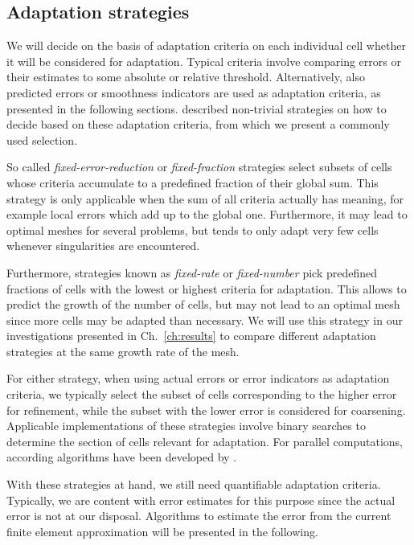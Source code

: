 \subsection{Adaptation strategies}
\label{ssec:strategy}

We will decide on the basis of adaptation criteria on each individual cell whether it will be considered for adaptation. Typical criteria involve comparing errors or their estimates to some absolute or relative threshold. Alternatively, also predicted errors or smoothness indicators are used as adaptation criteria, as presented in the following sections. \textcite[Sec.~5.2]{bangerth2003} described non-trivial strategies on how to decide based on these adaptation criteria, from which we present a commonly used selection.

So called \textit{fixed-error-reduction} or \textit{fixed-fraction} strategies select subsets of cells whose criteria accumulate to a predefined fraction of their global sum. This strategy is only applicable when the sum of all criteria actually has meaning, for example local errors which add up to the global one. Furthermore, it may lead to optimal meshes for several problems, but tends to only adapt very few cells whenever singularities are encountered.

Furthermore, strategies known as \textit{fixed-rate} or \textit{fixed-number} pick predefined fractions of cells with the lowest or highest criteria for adaptation. This allows to predict the growth of the number of cells, but may not lead to an optimal mesh since more cells may be adapted than necessary. We will use this strategy in our investigations presented in Ch.~\ref{ch:results} to compare different adaptation strategies at the same growth rate of the mesh.

For either strategy, when using actual errors or error indicators as adaptation criteria, we typically select the subset of cells corresponding to the higher error for refinement, while the subset with the lower error is considered for coarsening. Applicable implementations of these strategies involve binary searches to determine the section of cells relevant for adaptation. For parallel computations, according algorithms have been developed by \textcites[Sec.~3.1]{burstedde2008}[Sec.~5.1]{bangerth2012}.

With these strategies at hand, we still need quantifiable adaptation criteria. Typically, we are content with error estimates for this purpose since the actual error is not at our disposal. Algorithms to estimate the error from the current finite element approximation will be presented in the following.



